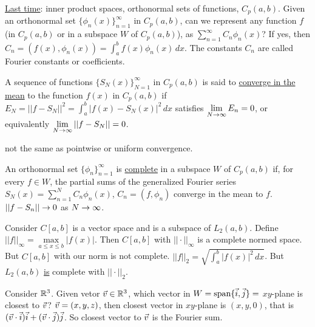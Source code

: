 \documentclass[]{article}
\begin{document}
\underline{Last time}: inner product spaces, orthonormal sets of functions, $C_p(a,b)$.
Given an orthonormal set $\{\phi_n(x)\}_{n=1}^\infty$ in $C_p(a,b)$, can we represent any function $f$ (in $C_p(a,b)$ or in a subspace $W$ of $C_p(a,b)$), as $\sum_{n=1}^\infty C_n \phi_n(x)$? If yes, then $C_n = (f(x),\phi_n(x)) = \int_a^b f(x) \phi_n(x) \, dx$. The constants $C_n$ are called Fourier constants or coefficients.
\begin{definition}
	A sequence of functions $\{S_N(x)\}_{N=1}^\infty$ in $C_p(a,b)$ is said to \underline{converge in the mean} to the function $f(x)$ in $C_p(a,b)$ if $E_N = ||f-S_N||^2 = \int_a^b |f(x)-S_N(x)|^2 \, dx$ satisfies $\displaystyle\lim_{N\rightarrow\infty} E_n = 0$, or equivalently $\displaystyle\lim_{N\rightarrow\infty} ||f-S_N|| = 0$.
\end{definition}
\begin{note}
	not the same as pointwise or uniform convergence.
\end{note}
\begin{definition}
	An orthonormal set $\{\phi_n\}_{n=1}^\infty$ is \underline{complete} in a subspace $W$ of $C_p(a,b)$ if, for every $f\in W$, the partial sums of the generalized Fourier series $S_N(x) = \sum_{n=1}^N C_n \phi_n(x)$, $C_n = (f,\phi_n)$ converge in the mean to $f$. $||f-S_n|| \rightarrow 0$ as $N\rightarrow \infty$.
\end{definition}
\begin{remark}
	Consider $C[a,b]$ is a vector space and is a subspace of $L_2(a,b)$. Define $||f||_\infty = \underset{a\leq x \leq b}{\max}|f(x)|$. Then $C[a,b]$ with $||\cdot||_\infty$ is a complete normed space. But $C[a,b]$ with our norm is not complete. $||f||_2 = \sqrt{\int_a^b |f(x)|^2 \, dx}$. But $L_2(a,b)$ \underline{is} complete with $||\cdot ||_2$.
\end{remark}

Consider $\mathbb{R}^3$. Given vetor $\vec{v}\in\mathbb{R}^3$, which vector in $W = \text{span}\{\vec{i}, \vec{j}\} = $ $xy$-plane is closest to $\vec{v}$? $\vec{v}=(x,y,z)$, then closest vector in $xy$-plane is $(x,y,0)$, that is $(\vec{v}\cdot\vec{i})\vec{i} + (\vec{v}\cdot\vec{j})\vec{j}$. So closest vector to $\vec{v}$ is the Fourier sum.
\end{document}
